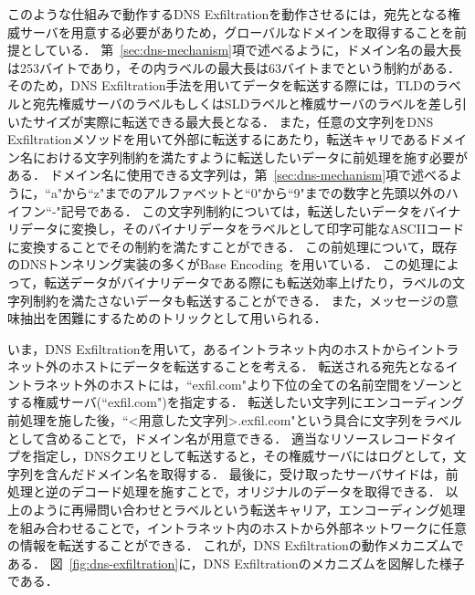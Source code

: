このような仕組みで動作するDNS Exfiltrationを動作させるには，宛先となる権威サーバを用意する必要がありため，グローバルなドメインを取得することを前提としている．
第~\ref{sec:dns-mechanism}項で述べるように，ドメイン名の最大長は253バイトであり，その内ラベルの最大長は63バイトまでという制約がある．
そのため，DNS Exfiltration手法を用いてデータを転送する際には，TLDのラベルと宛先権威サーバのラベルもしくはSLDラベルと権威サーバのラベルを差し引いたサイズが実際に転送できる最大長となる．
また，任意の文字列をDNS Exfiltrationメソッドを用いて外部に転送するにあたり，転送キャリであるドメイン名における文字列制約を満たすように転送したいデータに前処理を施す必要がある．
ドメイン名に使用できる文字列は，第~\ref{sec:dns-mechanism}項で述べるように，``a"から``z"までのアルファベットと``0"から``9"までの数字と先頭以外のハイフン``-"記号である．
この文字列制約については，転送したいデータをバイナリデータに変換し，そのバイナリデータをラベルとして印字可能なASCIIコードに変換することでその制約を満たすことができる．
この前処理について，既存のDNSトンネリング実装の多くがBase Encoding~\cite{rfc4648}を用いている．
この処理によって，転送データがバイナリデータである際にも転送効率上げたり，ラベルの文字列制約を満たさないデータも転送することができる．
また，メッセージの意味抽出を困難にするためのトリックとして用いられる．

いま，DNS Exfiltrationを用いて，あるイントラネット内のホストからイントラネット外のホストにデータを転送することを考える．
転送される宛先となるイントラネット外のホストには，``exfil.com"より下位の全ての名前空間をゾーンとする権威サーバ(``exfil.com")を指定する．
転送したい文字列にエンコーディング前処理を施した後，``<用意した文字列>.exfil.com"という具合に文字列をラベルとして含めることで，ドメイン名が用意できる．
適当なリソースレコードタイプを指定し，DNSクエリとして転送すると，その権威サーバにはログとして，文字列を含んだドメイン名を取得する．
最後に，受け取ったサーバサイドは，前処理と逆のデコード処理を施すことで，オリジナルのデータを取得できる．
以上のように再帰問い合わせとラベルという転送キャリア，エンコーディング処理を組み合わせることで，イントラネット内のホストから外部ネットワークに任意の情報を転送することができる．
これが，DNS Exfiltrationの動作メカニズムである．
図~\ref{fig:dns-exfiltration}に，DNS Exfiltrationのメカニズムを図解した様子である．



